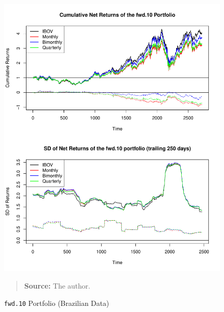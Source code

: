 \documentclass[preprint, doubleblind, authoryear,10pt]{elsarticle}
\begin{document}
\begin{figure}[htpb]
\centering
\footnotesize
\caption{\texttt{fwd.10} Portfolio (Brazilian Data)}
\label{fig:ibov:fwd.10}
\includegraphics[width=.95\linewidth]{./figs/IBOV-retac-fwd-10.pdf}
\begin{quote}
\textbf{Source:} The author.
\end{quote}
\end{figure}
\end{document}
